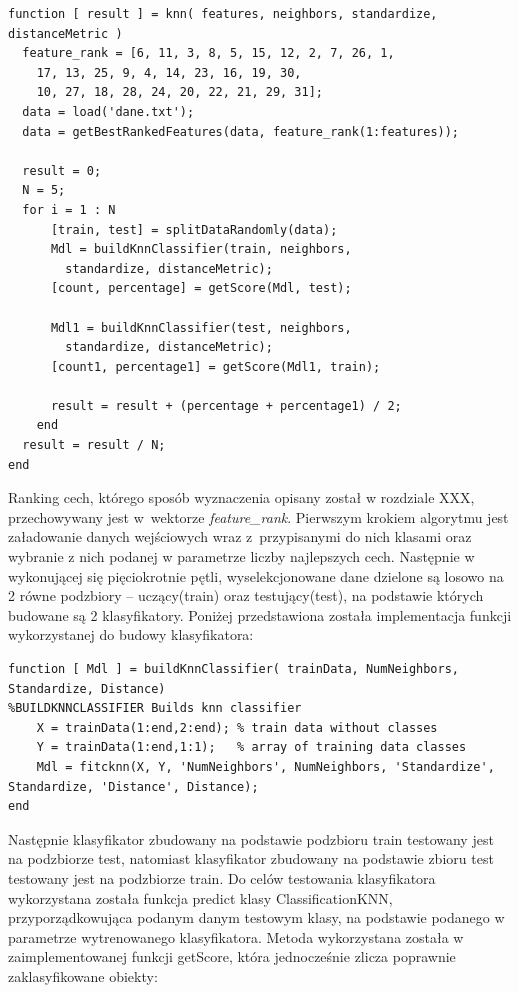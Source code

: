 \documentclass[11pt, a4paper, titlepage]{report}
\begin{document}
\begin{lstlisting}[label={lst:knn},caption={Algorytm walidacji krzyżowej dla algorytmu kNN.}]
function [ result ] = knn( features, neighbors, standardize, distanceMetric )
  feature_rank = [6, 11, 3, 8, 5, 15, 12, 2, 7, 26, 1,
    17, 13, 25, 9, 4, 14, 23, 16, 19, 30,
    10, 27, 18, 28, 24, 20, 22, 21, 29, 31];
  data = load('dane.txt');
  data = getBestRankedFeatures(data, feature_rank(1:features));

  result = 0;
  N = 5;
  for i = 1 : N
      [train, test] = splitDataRandomly(data);
      Mdl = buildKnnClassifier(train, neighbors,
        standardize, distanceMetric);
      [count, percentage] = getScore(Mdl, test);

      Mdl1 = buildKnnClassifier(test, neighbors,
        standardize, distanceMetric);
      [count1, percentage1] = getScore(Mdl1, train);

      result = result + (percentage + percentage1) / 2;
    end
  result = result / N;
end
\end{lstlisting}

Ranking cech, którego sposób wyznaczenia opisany został w rozdziale XXX, przechowywany jest w wektorze \textit{feature\_rank}. Pierwszym krokiem algorytmu jest załadowanie danych wejściowych wraz z przypisanymi do nich klasami oraz wybranie z nich podanej w parametrze liczby najlepszych cech.
Następnie w wykonującej się pięciokrotnie pętli, wyselekcjonowane dane dzielone są losowo na 2 równe podzbiory – uczący(train) oraz testujący(test), na podstawie których budowane są 2 klasyfikatory. Poniżej przedstawiona została implementacja funkcji wykorzystanej do budowy klasyfikatora:\\

\begin{lstlisting}[label={lst:knn_klasyfikator},caption={Budowa klasyfikatora kNN.}]
function [ Mdl ] = buildKnnClassifier( trainData, NumNeighbors, Standardize, Distance)
%BUILDKNNCLASSIFIER Builds knn classifier
    X = trainData(1:end,2:end); % train data without classes
    Y = trainData(1:end,1:1);   % array of training data classes
    Mdl = fitcknn(X, Y, 'NumNeighbors', NumNeighbors, 'Standardize', Standardize, 'Distance', Distance);
end
\end{lstlisting}

Następnie klasyfikator zbudowany na podstawie podzbioru train testowany jest na podzbiorze test, natomiast klasyfikator zbudowany na podstawie zbioru test testowany jest na podzbiorze train. Do celów testowania klasyfikatora wykorzystana została funkcja predict klasy ClassificationKNN, przyporządkowująca podanym danym testowym klasy, na podstawie podanego w parametrze wytrenowanego klasyfikatora. Metoda wykorzystana została w zaimplementowanej funkcji getScore, która jednocześnie zlicza poprawnie zaklasyfikowane obiekty:\\
\end{document}

